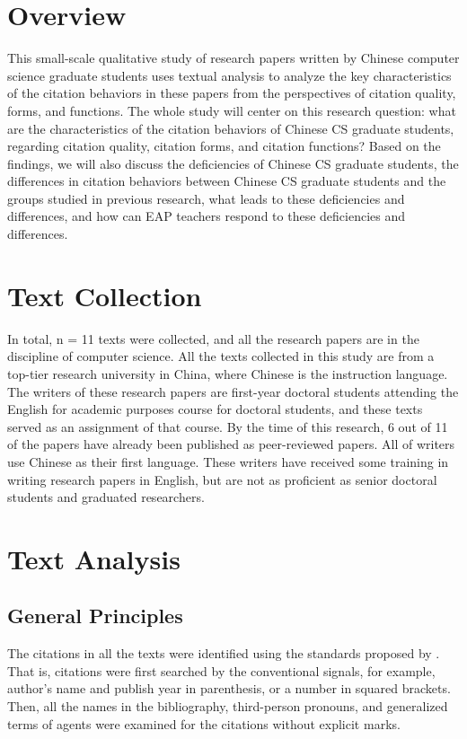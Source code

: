 \section{Overview}
This small-scale qualitative study of research papers written by Chinese computer science graduate students uses textual analysis to analyze the key characteristics of the citation behaviors in these papers from the perspectives of citation quality, forms, and functions. The whole study will center on this research question: what are the characteristics of the citation behaviors of Chinese CS graduate students, regarding citation quality, citation forms, and citation functions? Based on the findings, we will also discuss the deficiencies of Chinese CS graduate students, the differences in citation behaviors between Chinese CS graduate students and the groups studied in previous research, what leads to these deficiencies and differences, and how can EAP teachers respond to these deficiencies and differences.

\section{Text Collection}
In total, n = 11 texts were collected, and all the research papers are in the discipline of computer science. All the texts collected in this study are from a top-tier research university in China, where Chinese is the instruction language. The writers of these research papers are first-year doctoral students attending the English for academic purposes course for doctoral students, and these texts served as an assignment of that course. By the time of this research, 6 out of 11 of the papers have already been published as peer-reviewed papers. All of writers use Chinese as their first language. These writers have received some training in writing research papers in English, but are not as proficient as senior doctoral students and graduated researchers.

\section{Text Analysis}
\subsection{General Principles}
The citations in all the texts were identified using the standards proposed by \citet{hyland_academic_1999}. That is, citations were first searched by the conventional signals, for example, author’s name and publish year in parenthesis, or a number in squared brackets. Then, all the names in the bibliography, third-person pronouns, and generalized terms of agents were examined for the citations without explicit marks.


